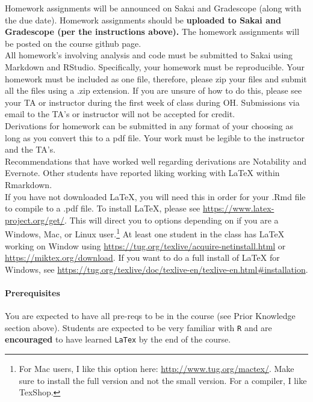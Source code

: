 \documentclass[11pt]{article}
\begin{document}
Homework assignments will be announced on Sakai and Gradescope (along with the due date). Homework assignments should be \textbf{uploaded to Sakai and Gradescope (per the instructions above).} The homework assignments will be posted on the course github page. \\

All homework's involving analysis and code must be submitted to Sakai using Markdown and RStudio. Specifically, your homework must be reproducible. Your homework must be included as one file, therefore, please zip your files and submit all the files using a .zip extension. If you are unsure of how to do this, please see your TA or instructor during the first week of class during OH. Submissions via email to the TA's or instructor will not be accepted for credit. \\

Derivations for homework can be submitted in any format of your choosing as long as you convert this to a pdf file. Your work must be legible to the instructor and the TA's. \\

Recommendations that have worked well regarding derivations are Notability and Evernote. Other students have reported liking working with LaTeX within Rmarkdown. \\

If you have not downloaded LaTeX, you will need this in order for your .Rmd file to compile to a .pdf file. To install LaTeX, please see \url{https://www.latex-project.org/get/}. This will direct you to options depending on if you are a Windows, Mac, or Linux user.\footnote{For Mac users, I like this option here: \url{http://www.tug.org/mactex/}. Make sure to install the full version and not the small version. For a compiler, I like TexShop.}  At least one student in the class has LaTeX working on Window using \url{https://tug.org/texlive/acquire-netinstall.html} or \url{https://miktex.org/download}. If you want to do a full install of LaTeX for Windows, see \url{https://tug.org/texlive/doc/texlive-en/texlive-en.html#installation}.


\paragraph{Prerequisites}

You are expected to have all pre-reqs to be in the course (see Prior Knowledge section above). Students are expected to be very familiar with \texttt{R} and are \textbf{encouraged} to have learned \texttt{LaTex} by the end of the course. 
\end{document}
